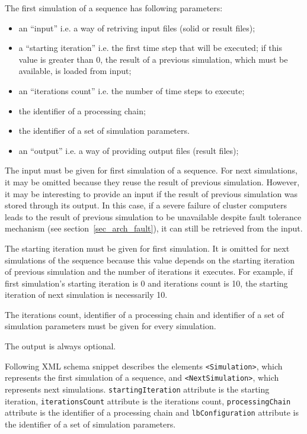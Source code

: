 The first simulation of a sequence has following parameters:

\begin{itemize}
\setlength{\itemsep}{0ex}
	\item an ``input'' i.e. a way of retriving input files (solid or result
	files);
	\item a ``starting iteration'' i.e. the first time step that will be executed; if
	this value is greater than 0, the result of a previous simulation, which must
	be available, is loaded from input;
	\item an ``iterations count'' i.e. the number of time steps to execute;
	\item the identifier of a processing chain;
	\item the identifier of a set of simulation parameters.
	\item an ``output'' i.e. a way of providing output files (result files);
\end{itemize}

The input must be given for first simulation of a sequence. For next
simulations, it may be omitted because they reuse the result of previous
simulation. However, it may be interesting to provide an input if the result of
previous simulation was stored through its output. In this case, if a
severe failure of cluster computers leads to the result of previous simulation
to be unavailable despite fault tolerance mechanism (see
section~\ref{sec_arch_fault}), it can still be retrieved from the input.

The starting iteration must be given for first simulation. It is omitted for
next simulations of the sequence because this value depends on the starting
iteration of previous simulation and the number of iterations it executes. For
example, if first simulation's starting iteration is 0 and iterations count is
10, the starting iteration of next simulation is necessarily 10.

The iterations count, identifier of a processing chain and identifier of a set
of simulation parameters must be given for every simulation.

The output is always optional.

Following XML schema snippet describes the elements \verb|<Simulation>|, which
represents the first simulation of a sequence, and \verb|<NextSimulation>|,
which represents next simulations. \verb|startingIteration| attribute is the
starting iteration, \texttt{iterations\-Count} attribute is the iterations
count, \verb|processingChain| attribute is the identifier of a processing chain and
\verb|lbConfiguration| attribute is the identifier of a set of simulation
parameters.

